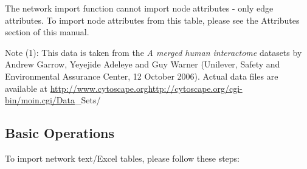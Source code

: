 The network import function cannot import node attributes - only edge attributes. To import node attributes from this table, please see the Attributes section of this manual. 

 Note (1): This data is taken from the \emph{A merged human interactome}
 datasets by Andrew Garrow, Yeyejide Adeleye and Guy Warner (Unilever, Safety and Environmental Assurance Center, 12 October 2006). Actual data files are available at \url{http://www.cytoscape.orghttp://cytoscape.org/cgi-bin/moin.cgi/Data}\_Sets/
 
\subsection{Basic Operations}

 To import network text/Excel tables, please follow these steps: 

